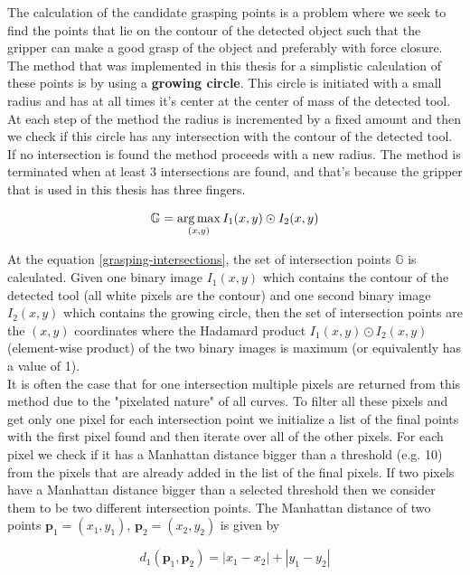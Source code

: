 The calculation of the candidate grasping points is a problem where we seek to find the points that lie on the contour of the detected object such that the gripper can make a good grasp of the object and preferably with 
force closure. The method that was implemented in this thesis for a simplistic calculation of these points is by using a \textbf{growing circle}. This circle is initiated with a small radius and has at all times it's center at the 
center of mass of the detected tool. At each step of the method the radius is incremented by a fixed amount and then we check if this circle has any intersection with the contour of the detected tool. If no intersection 
is found the method proceeds with a new radius. The method is terminated when at least 3 intersections are found, and that's because the gripper that is used in this thesis has three fingers.

\begin{equation}
\label{grasping-intersections}
\mathbb{G} = \operatorname*{arg\,max}_{(x,y)} I_1(x,y) \odot I_2(x,y)
\end{equation}

At the equation \ref{grasping-intersections}, the set of intersection points $\mathbb{G}$ is calculated. Given one binary image $I_1(x,y)$ which contains the contour of the detected tool (all white pixels are the contour) 
and one second binary image $I_2(x,y)$ which contains the growing circle, then the set of intersection points are the $(x, y)$ coordinates where the Hadamard product $I_1(x,y) \odot I_2(x,y)$ (element-wise product) of the 
two binary images is 
maximum (or equivalently has a value of 1).\\ 

It is often the case that for one intersection multiple pixels are returned from this method due to the "pixelated nature" of all curves. To filter all these pixels and get only one pixel for each intersection point 
we initialize a list of the final points with the first pixel found and then iterate over all of the other pixels. For each pixel we check if it has a Manhattan distance bigger than a threshold (e.g. 10) from the pixels that 
are already added in the list of the final pixels. If two pixels have a Manhattan distance bigger than a selected threshold then we consider them to be two different intersection points. The Manhattan distance of two 
points $\mathbf{p}_1=(x_1,y_1)$, ${\mathbf{p}_2=(x_2,y_2)}$ is given by

\begin{equation}
d_1(\mathbf{p}_1, \mathbf{p}_2) = |x_1 - x_2| + |y_1 - y_2|
\end{equation}

